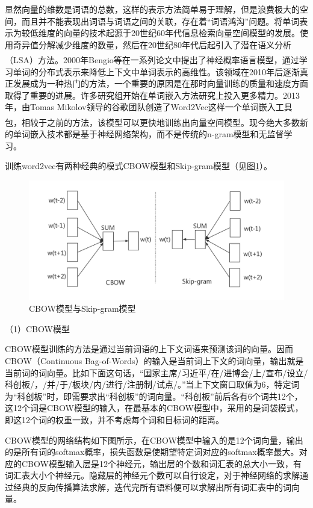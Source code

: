 \documentclass[winfonts,master,oneside,nobackinfo]{njuthesis}
\newcommand{\upcite}[1]{\textsuperscript{\textsuperscript{\cite{#1}}}}
\begin{document}
显然向量的维数是词语的总数，这样的表示方法简单易于理解，但是浪费极大的空间，而且并不能表现出词语与词语之间的关联，存在着“词语鸿沟”问题。将单词表示为较低维度的向量的技术起源于20世纪60年代信息检索向量空间模型的发展。使用奇异值分解减少维度的数量，然后在20世纪80年代后起引入了潜在语义分析（LSA）方法。2000年Bengio等\upcite{Bengio}在一系列论文中提出了神经概率语言模型，通过学习单词的分布式表示来降低上下文中单词表示的高维性。该领域在2010年后逐渐真正发展成为一种热门的方法，一个重要的原因是在那时向量训练的质量和速度方面取得了重要的进展。许多研究组开始在单词嵌入方法研究上投入更多精力。2013年，由Tomas Mikolov领导的谷歌团队创造了Word2Vec这样一个单词嵌入工具包\upcite{word2vec}，相较于之前的方法，该模型可以更快地训练出向量空间模型。现今绝大多数新的单词嵌入技术都是基于神经网络架构，而不是传统的n-gram模型和无监督学习。

训练word2vec有两种经典的模式CBOW模型和Skip-gram模型（见图\ref{cbow-skip}）。

\begin{figure}[h]
\centering
\includegraphics[width=	1\textwidth]{./figure/CBOW模型.jpg}
\caption{CBOW模型与Skip-gram模型}
\label{cbow-skip}
\end{figure}

（1）CBOW模型

CBOW模型训练的方法是通过当前词语的上下文词语来预测该词的向量。因而CBOW（Continuous Bag-of-Words）的输入是当前词上下文的词向量，输出就是当前词的词向量。比如下面这句话，“国家主席/习近平/在/进博会/上/宣布/设立/科创板/，/并/于/板块/内/进行/注册制/试点/。”当上下文窗口取值为6，特定词为“科创板”时，即需要求出“科创板”的词向量。“科创板”前后各有6个词共12个，这12个词是CBOW模型的输入，在最基本的CBOW模型中，采用的是词袋模式，即这12个词的权重一致，并不考虑每个词和目标词的距离。

CBOW模型的网络结构如下图所示，在CBOW模型中输入的是12个词向量，输出的是所有词的softmax概率，损失函数是使期望特定词对应的softmax概率最大。对应的CBOW模型输入层是12个神经元，输出层的个数和词汇表的总大小一致，有词汇表大小个神经元。隐藏层的神经元个数可以自行设定，对于神经网络的求解通过经典的反向传播算法求解，迭代完所有语料便可以求解出所有词汇表中的词向量。
\end{document}
